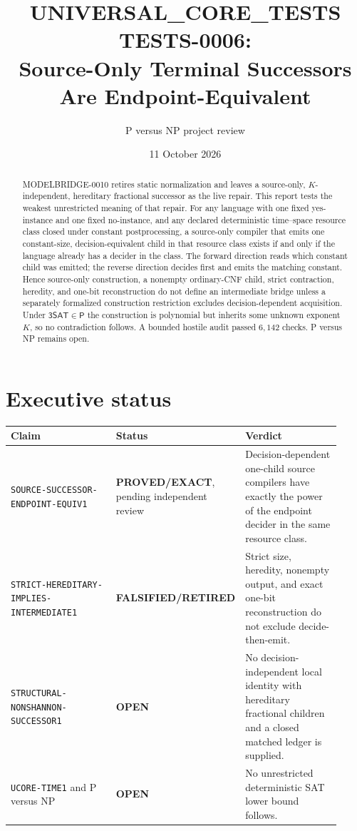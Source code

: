 \documentclass[11pt]{article}
\title{UNIVERSAL\_CORE\_TESTS TESTS-0006:\\
Source-Only Terminal Successors Are Endpoint-Equivalent}
\author{P versus NP project review}
\date{11 October 2026}
\newcommand{\SAT}{\mathsf{3SAT}}
\newcommand{\EXACT}{\textbf{PROVED/EXACT}}
\newcommand{\OPEN}{\textbf{OPEN}}
\newcommand{\RETIRED}{\textbf{FALSIFIED/RETIRED}}
\begin{document}
\maketitle

\begin{abstract}
MODELBRIDGE-0010 retires static normalization and leaves a source-only,
$K$-independent, hereditary fractional successor as the live repair.  This
report tests the weakest unrestricted meaning of that repair.  For any
language with one fixed yes-instance and one fixed no-instance, and any
declared deterministic time--space resource class closed under constant
postprocessing, a source-only compiler that emits one constant-size,
decision-equivalent child in that resource class exists if and only if the
language already has a decider in the class.  The forward direction reads
which constant child was emitted; the reverse direction decides first and
emits the matching constant.  Hence source-only construction, a nonempty
ordinary-CNF child, strict contraction, heredity, and one-bit reconstruction
do not define an intermediate bridge unless a separately formalized
construction restriction excludes decision-dependent acquisition.  Under
$\SAT\in\mathsf P$ the construction is polynomial but inherits some unknown
exponent $K$, so no contradiction follows.  A bounded hostile audit passed
$6{,}142$ checks.  P versus NP remains open.
\end{abstract}

\section{Executive status}

\begin{center}
\small
\begin{tabular}{p{0.38\linewidth}p{0.20\linewidth}p{0.34\linewidth}}
\toprule
Claim & Status & Verdict\\
\midrule
\texttt{SOURCE-SUCCESSOR-ENDPOINT-EQUIV1} & \EXACT, pending independent review &
Decision-dependent one-child source compilers have exactly the power of the
endpoint decider in the same resource class.\\
\texttt{STRICT-HEREDITARY-IMPLIES-INTERMEDIATE1} & \RETIRED &
Strict size, heredity, nonempty output, and exact one-bit reconstruction do
not exclude decide-then-emit.\\
\texttt{STRUCTURAL-NONSHANNON-SUCCESSOR1} & \OPEN &
No decision-independent local identity with hereditary fractional children
and a closed matched ledger is supplied.\\
\texttt{UCORE-TIME1} and P versus NP & \OPEN &
No unrestricted deterministic SAT lower bound follows.\\
\bottomrule
\end{tabular}
\end{center}
\end{document}
